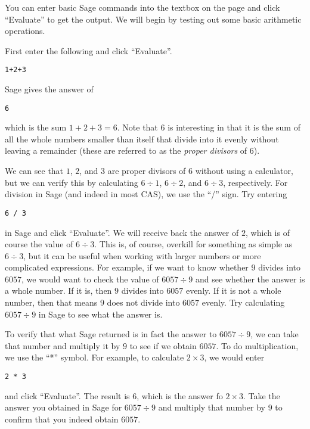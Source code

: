 You can enter basic Sage commands into the textbox on the page and
click ``Evaluate'' to get the output. We will begin by testing out some basic
arithmetic operations.

First enter the following and click ``Evaluate''.

\begin{verbatim}
1+2+3
\end{verbatim}

Sage gives the answer of

\begin{verbatim}6\end{verbatim}

which is the sum $1+2+3=6$. Note that $6$ is interesting in that it is the
sum of all the whole numbers smaller than itself that divide into it evenly
without leaving a remainder (these are referred to as the
\textit{proper divisors} of 6).

We can see that $1$, $2$, and $3$ are proper divisors of 6 without using
a calculator, but we can verify this by calculating $6 \div 1$, $6 \div 2$,
and $6 \div 3$, respectively. For division in Sage (and indeed in most
CAS), we use the ``/'' sign. Try entering

\begin{verbatim}
6 / 3
\end{verbatim}

in Sage and click ``Evaluate''. We will receive back the answer of $2$,
which is of course the value of $6 \div 3$. This is, of course, overkill
for something as simple as $6 \div 3$, but it can be useful when working
with larger numbers or more complicated expressions. For example,
if we want to know whether $9$ divides into $6057$, we would want
to check the value of $6057 \div 9$ and see whether the answer is
a whole number. If it is, then $9$ divides into $6057$ evenly. If it is not
a whole number, then that means $9$ does not divide into $6057$ evenly.
Try calculating $6057 \div 9$ in Sage to see what the answer is.

To verify that what Sage returned is in fact the answer to $6057 \div 9$,
we can take that number and multiply it by $9$ to see if we obtain
$6057$. To do multiplication, we use the ``*'' symbol. For example,
to calculate $2 \times 3$, we would enter

\begin{verbatim}
2 * 3
\end{verbatim}

and click ``Evaluate''. The result is $6$, which is the answer fo $2 \times 3$.
Take the answer you obtained in Sage for $6057 \div 9$ and multiply that
number by $9$ to confirm that you indeed obtain $6057$.

